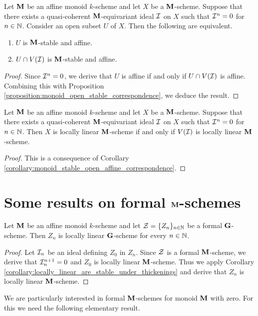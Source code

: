 \begin{corollary}\label{corollary:monoid_stable_open_affine_correspondence}
Let $\mathbf{M}$ be an affine monoid $k$-scheme and let $X$ be a $\mathbf{M}$-scheme. Suppose that there exists a quasi-coherent $\mathbf{M}$-equivariant ideal ${\mathcal I}$ on $X$ such that ${\mathcal I}^n = 0$ for $n\in {\mathbb N}$. Consider an open subset $U$ of $X$. Then the following are equivalent.
\begin{enumerate}[label=\emph{\textbf{(\arabic*)}}, leftmargin=3.0em]
\item $U$ is $\mathbf{M}$-stable and affine.
\item $U\cap V({\mathcal I})$ is $\mathbf{M}$-stable and affine.
\end{enumerate}
\end{corollary}
\begin{proof}
Since ${\mathcal I}^n = 0$, we derive that $U$ is affine if and only if $U\cap V({\mathcal I})$ is affine. Combining this with Proposition \ref{proposition:monoid_open_stable_correspondence}, we deduce the result.
\end{proof}

\begin{corollary}\label{corollary:locally_linear_are_stable_under_thickenings}
Let $\mathbf{M}$ be an affine monoid $k$-scheme and let $X$ be a $\mathbf{M}$-scheme. Suppose that there exists a quasi-coherent $\mathbf{M}$-equivariant ideal ${\mathcal I}$ on $X$ such that ${\mathcal I}^n = 0$ for $n\in {\mathbb N}$. Then $X$ is locally linear $\mathbf{M}$-scheme if and only if $V({\mathcal I})$ is locally linear $\mathbf{M}$-scheme.
\end{corollary}
\begin{proof}
This is a consequence of Corollary \ref{corollary:monoid_stable_open_affine_correspondence}.
\end{proof}

\section{Some results on formal $\mathbf{M}$-schemes}

\begin{corollary}\label{corollary:each_formal_scheme_consists_of_locally_linear_schemes_if_group_is_affine}
Let $\mathbf{M}$ be an affine monoid $k$-scheme and let ${\mathcal Z} = \{Z_n\}_{n\in {\mathbb N}}$ be a formal $\mathbf{G}$-scheme. Then $Z_n$ is locally linear $\mathbf{G}$-scheme for every $n\in {\mathbb N}$.
\end{corollary}
\begin{proof}
Let ${\mathcal I}_n$ be an ideal defining $Z_0$ in $Z_n$. Since ${\mathcal Z}$ is a formal $\mathbf{M}$-scheme, we derive that ${\mathcal I}_n^{n+1} = 0$ and $Z_0$ is locally linear $\mathbf{M}$-scheme. Thus we apply Corollary \ref{corollary:locally_linear_are_stable_under_thickenings} and derive that $Z_n$ is locally linear $\mathbf{M}$-scheme.
\end{proof}
\noindent
We are particularly interested in formal $\mathbf{M}$-schemes for monoid $\mathbf{M}$ with zero. For this we need the following elementary result.

